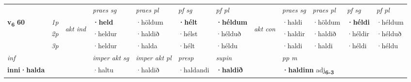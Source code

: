 \begin{longtable}[l]{X>{\footnotesize\itshape}llXXXXlXXXX}
 & &   & \textit{praes sg}  & \textit{praes pl}    & \textit{ pf sg} & \textit{pf pl} & & \textit{praes sg}  & \textit{praes pl}    & \textit{pf sg} & \textit{pf pl }  \\ \cmidrule{4-7} \cmidrule{9-12}
 \multirow{2}{*}{{{\textbf{v{\textsubscript{6}}} \Large{\textbf{60}}}}}  & 1p & \multirow{3}{*}{\begin{turn}{90}\textit{akt ind}\end{turn}} & \textbf{·held} & ·höldum & \textbf{·hélt} & \textbf{·héldum} & \multirow{3}{*}{\begin{turn}{90}\textit{akt con}\end{turn}} &·haldi & ·höldum & \textbf{·héldi} & ·héldum\\*
 & 2p &  &  ·heldur  & ·haldið & ·hélst & ·hélduð & & ·haldir & ·haldið & ·héldir & ·hélduð \\*
 & 3p &  & ·heldur & ·halda & ·hélt & ·héldu & & ·haldi & ·haldi& ·héldi & ·héldu \\*
\cmidrule{4-7} \cmidrule{9-12}

   {\textit{inf}} & &  & \textit{imper akt sg} & \textit{imper akt pl}   & \textit{presp} & \textit{supin}  && \textit{pp m} \\*
  {\textbf{inni\allowbreak ·halda}} & && ·haltu  & ·haldið   & ·haldandi &  \textbf{·haldið}  && \multicolumn{2}{l}{\textbf{·haldinn} adj\textbf{\textsubscript{6-3}}} \\*


\end{longtable}

